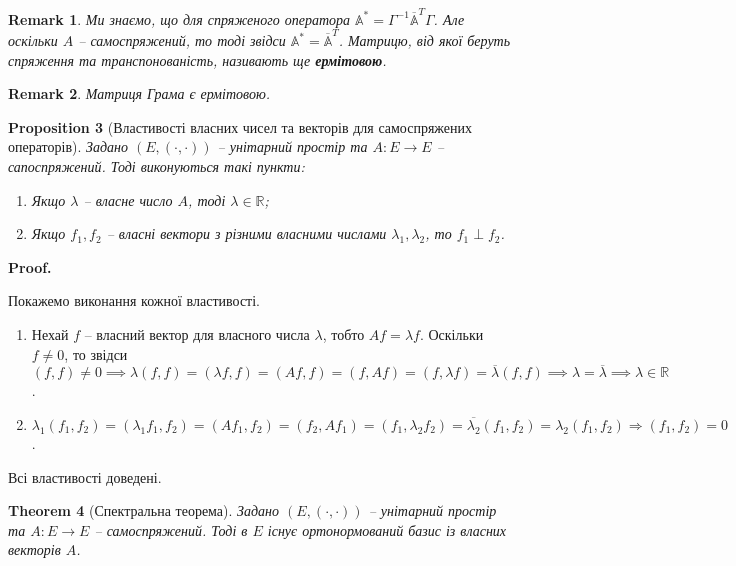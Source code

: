 \documentclass[a4paper, 10pt]{article}
\makeatletter
\theoremstyle{theoremdd}
\newtheorem{theorem}{Theorem}[subsection]
\newtheorem{proposition}[theorem]{Proposition}
\newtheorem{remark}[theorem]{Remark}
\renewenvironment{proof}[1][Proof.\\]{\par
\pushQED{\hfill \qed}%
\normalfont \topsep6\p@\@plus6\p@\relax
\trivlist
\item\relax
{\bfseries
#1\@addpunct{.}}\hspace\labelsep\ignorespaces
}{%
\popQED\endtrivlist\@endpefalse
}
\makeatother
\begin{document}
\begin{remark}
Ми знаємо, що для спряженого оператора $\mathbb{A}^* = \Gamma^{-1} \overline{\mathbb{A}}^T \Gamma$. Але оскільки $A$ -- самоспряжений, то тоді звідси $\mathbb{A}^* = \overline{\mathbb{A}}^T$. Матрицю, від якої беруть спряження та транспонованість, називають ще \textbf{ермітовою}.
\end{remark}

\begin{remark}
Матриця Грама є ермітовою.
\end{remark}

\begin{proposition}[Властивості власних чисел та векторів для самоспряжених операторів]
Задано $(E,(\cdot,\cdot))$ -- унітарний простір та $A \colon E \to E$ -- сапоспряжений. Тоді виконуються такі пункти:
\begin{enumerate}[nosep,wide=0pt,label={\arabic*)}]
\item Якщо $\lambda$ -- власне число $A$, тоді $\lambda \in \mathbb{R}$;
\item Якщо $f_1,f_2$ -- власні вектори з різними власними числами $\lambda_1, \lambda_2$, то $f_1 \perp f_2$.
\end{enumerate}
\end{proposition}

\begin{proof}
Покажемо виконання кожної властивості.
\begin{enumerate}[topsep=-\parskip, wide=0pt, label={\arabic*)}]
\item Нехай $f$ -- власний вектор для власного числа $\lambda$, тобто $Af = \lambda f$. Оскільки $f \neq 0$, то звідси $(f,f) \neq 0 \implies \lambda (f,f) = (\lambda f, f) = (Af,f) = (f,Af) = (f, \lambda f) = \overline{\lambda} (f,f) \implies \lambda = \overline{\lambda} \implies \lambda \in \mathbb{R}$.
\item $\lambda_1 (f_1,f_2) = (\lambda_1 f_1, f_2) = (Af_1, f_2) = (f_2, Af_1) = (f_1, \lambda_2 f_2) = \overline{\lambda_2} (f_1,f_2) = \lambda_2 (f_1,f_2) \Rightarrow (f_1,f_2) = 0$.
\end{enumerate}
Всі властивості доведені.
\end{proof}

\begin{theorem}[Спектральна теорема]
Задано $(E,(\cdot,\cdot))$ -- унітарний простір та $A \colon E \to E$ -- самоспряжений. Тоді в $E$ існує ортонормований базис із власних векторів $A$.
\end{theorem}
\end{document}
